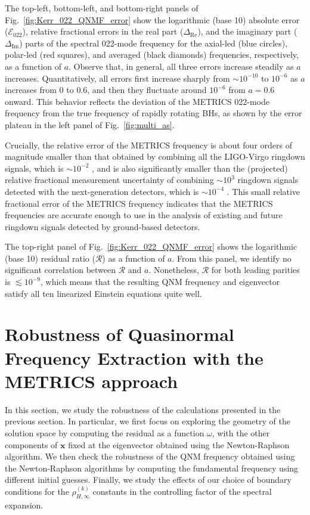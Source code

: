 \documentclass[aps,prx,amsmath,floats,floatfix,twocolumn,
  superscriptaddress,nofootinbib,showpacs]{revtex4-1}
\begin{document}
The top-left, bottom-left, and bottom-right panels of Fig.~\ref{fig:Kerr_022_QNMF_error} show the logarithmic (base 10) absolute error ($\mathcal{E}_{022}$), relative fractional errors in the real part ($\Delta_{\text{Re}}$), and the imaginary part ($\Delta_{\text{Im}}$) parts of the spectral 022-mode frequency for the axial-led (blue circles), polar-led (red squares), and averaged (black diamonds) frequencies, respectively, as a function of $a$.
Observe that, in general, all three errors increase steadily as $a$ increases.
Quantitatively, all errors first increase sharply from $\sim 10^{-10}$ to $10^{-6}$ as $a$ increases from 0 to $0.6$, and then they fluctuate around $10^{-6}$ from $a=0.6$ onward. This behavior reflects the deviation of the METRICS 022-mode frequency from the true frequency of rapidly rotating BHs, as shown by the error plateau in the left panel of Fig.~\ref{fig:multi_as}.

Crucially, the relative error of the METRICS frequency is about four orders of magnitude smaller than that obtained by combining all the LIGO-Virgo ringdown signals, which is $\sim 10^{-2}$ \cite{LIGOScientific:2021sio}, and is also significantly smaller than the (projected) relative fractional measurement uncertainty of combining $\sim 10^3$ ringdown signals detected with the next-generation detectors, which is  $\sim 10^{-4}$ \cite{Maselli:2023khq}.
This small relative fractional error of the METRICS frequency indicates that the METRICS frequencies are accurate enough to use in the analysis of existing and future ringdown signals detected by ground-based detectors. 

The top-right panel of Fig.~\ref{fig:Kerr_022_QNMF_error} shows the logarithmic (base 10) residual ratio ($\mathcal{R}$) as a function of $a$.
From this panel, we identify no significant correlation between $\mathcal{R}$ and $a$. 
Nonetheless, $\mathcal{R}$ for both leading parities is $\lesssim 10^{-9}$, which means that the resulting QNM frequency and eigenvector satisfy all ten linearized Einstein equations quite well. 

\section{Robustness of Quasinormal Frequency Extraction with the METRICS approach}
\label{sec:robustness}

In this section, we study the robustness of the calculations presented in the previous section. 
In particular, we first focus on exploring the geometry of the solution space by computing the residual as a function $\omega$, with the other components of $\textbf{x}$ fixed at the eigenvector obtained using the Newton-Raphson algorithm. 
We then check the robustness of the QNM frequency obtained using the Newton-Raphson algorithms by computing the fundamental frequency using different initial guesses. 
Finally, we study the effects of our choice of boundary conditions for the $\rho_{H,\infty}^{(k)}$ constants in the controlling factor of the spectral expansion.
\end{document}
